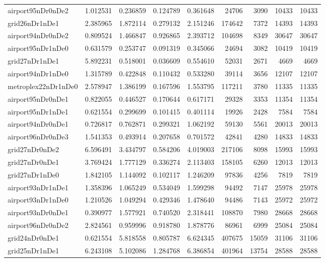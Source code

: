 \begin{longtable}{|l|r|r|r|r|r|r|r|r|}
airport95nDr0nDe2 & 1.012531 & 0.236859 & 0.124789 & 0.361648 & 24706 & 3090 & 10433 & 10433 \\
grid26nDr1nDe1 & 2.385965 & 1.872114 & 0.279132 & 2.151246 & 174642 & 7372 & 14393 & 14393 \\
airport94nDr0nDe2 & 0.809524 & 1.466847 & 0.926865 & 2.393712 & 104698 & 8349 & 30647 & 30647 \\
airport95nDr1nDe0 & 0.631579 & 0.253747 & 0.091319 & 0.345066 & 24694 & 3082 & 10419 & 10419 \\
grid27nDr1nDe1 & 5.892231 & 0.518001 & 0.036609 & 0.554610 & 52031 & 2671 & 4669 & 4669 \\
airport94nDr1nDe0 & 1.315789 & 0.422848 & 0.110432 & 0.533280 & 39114 & 3656 & 12107 & 12107 \\
metroplex22nDr1nDe0 & 2.578947 & 1.386199 & 0.167596 & 1.553795 & 117211 & 3780 & 11335 & 11335 \\
airport95nDr0nDe1 & 0.822055 & 0.446527 & 0.170644 & 0.617171 & 29328 & 3353 & 11354 & 11354 \\
airport95nDr1nDe1 & 0.621554 & 0.299699 & 0.101415 & 0.401114 & 19926 & 2428 & 7584 & 7584 \\
airport94nDr0nDe1 & 0.726817 & 0.762871 & 0.299321 & 1.062192 & 59130 & 5561 & 20013 & 20013 \\
airport96nDr0nDe3 & 1.541353 & 0.493914 & 0.207658 & 0.701572 & 42841 & 4280 & 14833 & 14833 \\
grid27nDr0nDe2 & 6.596491 & 3.434797 & 0.584206 & 4.019003 & 217106 & 8098 & 15993 & 15993 \\
grid27nDr0nDe1 & 3.769424 & 1.777129 & 0.336274 & 2.113403 & 158105 & 6260 & 12013 & 12013 \\
grid27nDr1nDe0 & 1.842105 & 1.144092 & 0.102117 & 1.246209 & 97836 & 4256 & 7819 & 7819 \\
airport93nDr1nDe1 & 1.358396 & 1.065249 & 0.534049 & 1.599298 & 94492 & 7147 & 25978 & 25978 \\
airport93nDr1nDe0 & 1.210526 & 1.049294 & 0.429346 & 1.478640 & 94486 & 7143 & 25972 & 25972 \\
airport93nDr0nDe1 & 0.390977 & 1.577921 & 0.740520 & 2.318441 & 108870 & 7980 & 28668 & 28668 \\
airport96nDr0nDe2 & 2.824561 & 0.959996 & 0.918780 & 1.878776 & 86961 & 6999 & 25084 & 25084 \\
grid24nDr0nDe1 & 0.621554 & 5.818558 & 0.805787 & 6.624345 & 407675 & 15059 & 31106 & 31106 \\
grid25nDr1nDe1 & 6.243108 & 5.102086 & 1.284768 & 6.386854 & 401964 & 13754 & 28588 & 28588 \\

\end{longtable}
